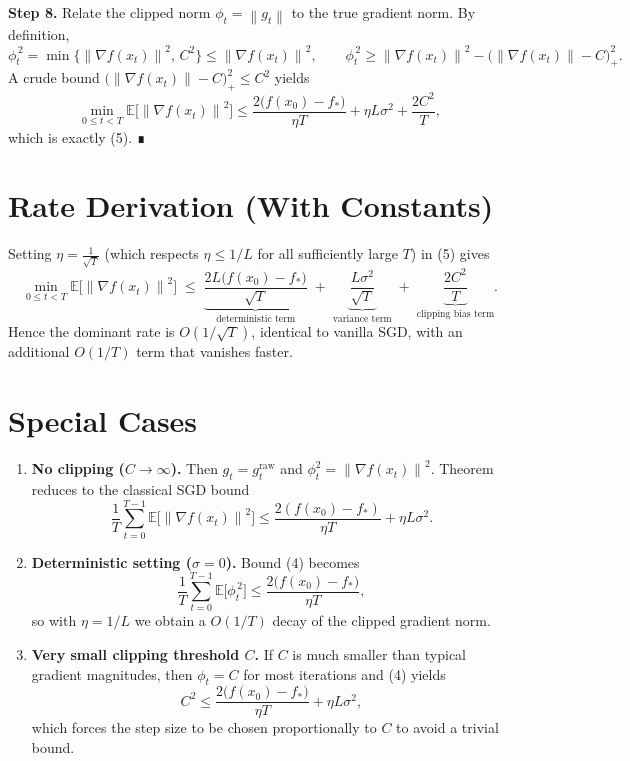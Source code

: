 \documentclass{article}
\newcommand{\E}{\mathbb{E}}
\newcommand{\norm}[1]{\left\lVert#1\right\rVert}
\begin{document}
\noindent\textbf{Step 8.} Relate the clipped norm $\phi_t=\norm{g_t}$ to the true
gradient norm. By definition,
\[
\phi_t^{\,2}= \min\!\bigl\{\norm{\nabla f(x_t)}^{2},\,C^{2}\bigr\}
\le \norm{\nabla f(x_t)}^{2},
\qquad
\phi_t^{\,2}\ge \norm{\nabla f(x_t)}^{2}-\bigl(\norm{\nabla f(x_t)}-C\bigr)_{+}^{2}.
\tag{19}
\]
A crude bound $\bigl(\norm{\nabla f(x_t)}-C\bigr)_{+}^{2}\le C^{2}$ yields
\[
\min_{0\le t<T}\E\!\bigl[\norm{\nabla f(x_t)}^{2}\bigr]
\le
\frac{2\bigl(f(x_0)-f_*\bigr)}{\eta T}
+\eta L\sigma^{2}
+\frac{2C^{2}}{T},
\tag{20}
\]
which is exactly (5). ∎

\section*{Rate Derivation (With Constants)}
Setting $\eta = \frac{1}{\sqrt{T}}$ (which respects $\eta\le 1/L$ for all
sufficiently large $T$) in (5) gives
\[
\min_{0\le t<T}\E\!\bigl[\norm{\nabla f(x_t)}^{2}\bigr]
\;\le\;
\underbrace{\frac{2L\bigl(f(x_0)-f_*\bigr)}{\sqrt{T}}}_{\text{deterministic term}}
\;+\;
\underbrace{\frac{L\sigma^{2}}{\sqrt{T}}}_{\text{variance term}}
\;+\;
\underbrace{\frac{2C^{2}}{T}}_{\text{clipping bias term}} .
\]
Hence the dominant rate is $O(1/\sqrt{T})$, identical to vanilla SGD, with an
additional $O(1/T)$ term that vanishes faster.

\section*{Special Cases}
\begin{enumerate}[leftmargin=*]
\item \textbf{No clipping ($C\to\infty$).}
Then $g_t=g^{\text{raw}}_t$ and $\phi_t^{2}=\norm{\nabla f(x_t)}^{2}$.  Theorem
reduces to the classical SGD bound
\[
\frac{1}{T}\sum_{t=0}^{T-1}\E\!\bigl[\norm{\nabla f(x_t)}^{2}\bigr]
\le
\frac{2(f(x_0)-f_*)}{\eta T}+\eta L\sigma^{2}.
\]

\item \textbf{Deterministic setting ($\sigma=0$).}
Bound (4) becomes
\[
\frac{1}{T}\sum_{t=0}^{T-1}\E\!\bigl[\phi_t^{\,2}\bigr]
\le\frac{2\bigl(f(x_0)-f_*\bigr)}{\eta T},
\]
so with $\eta=1/L$ we obtain a $O(1/T)$ decay of the clipped gradient norm.

\item \textbf{Very small clipping threshold $C$.}
If $C$ is much smaller than typical gradient magnitudes, then $\phi_t=C$ for
most iterations and (4) yields
\[
C^{2}\le\frac{2\bigl(f(x_0)-f_*\bigr)}{\eta T}+ \eta L\sigma^{2},
\]
which forces the step size to be chosen proportionally to $C$ to avoid a
trivial bound.
\end{enumerate}
\end{document}
